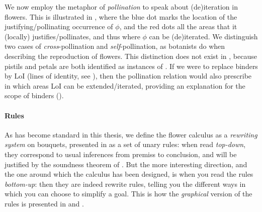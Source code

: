 We now employ the metaphor of \emph{pollination} to speak about (de)iteration in
flowers. This is illustrated in , where the blue dot marks
the location of the justifying/pollinating occurrence of $\phi$, and the red
dots all the areas that it (locally) justifies/pollinates, and thus where $\phi$
can be (de)iterated. We distinguish two cases of
\emph{cross}-pollination and \emph{self}-pollination, as botanists do when
describing the reproduction of flowers. This distinction does not exist in
 , because pistils and petals are both identified as
instances of . If we were to replace
binders by LoI (lines of identity, see ), then the pollination
relation would also prescribe in which areas LoI can be extended/iterated,
providing an explanation for the scope of binders ().

\paragraph{Rules}

As has become standard in this thesis, we define the flower calculus as a
\emph{rewriting system} on bouquets, presented in  as a
set of unary  rules: when read \emph{top-down}, they correspond to
usual inferences from premiss to conclusion, and will be justified by the
soundness theorem of .
But the more interesting direction, and the one around which the calculus has
been designed, is when you read the rules \emph{bottom-up}: then they are indeed
rewrite rules, telling you the different ways in which you can choose to
simplify a goal. This is how the \emph{graphical} version of the rules is
presented in  and .

